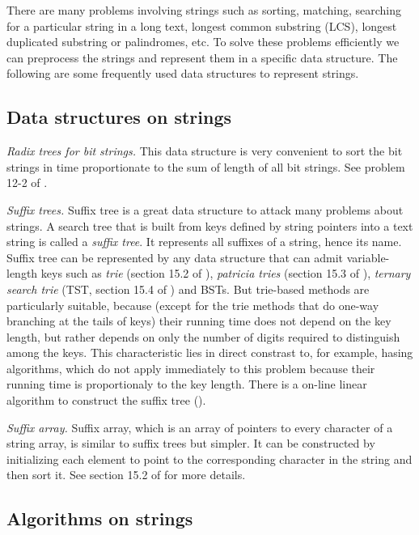 \documentclass[12pt]{article}
\begin{document}
There are many problems involving strings such as sorting, matching, searching for a
particular string in a long text, longest common substring (LCS), longest
duplicated substring or palindromes, etc.  To solve these problems
efficiently we can preprocess the strings and represent them in a
specific data structure.  The following are some frequently used data
structures to represent strings.

\subsection{Data structures on strings}

\emph{Radix trees for bit strings.}
    This data structure is very convenient to sort the bit strings in
    time proportionate to the sum of length of all bit strings.  See
    problem 12-2 of \cite{clrs2}.

\emph{Suffix trees.}
    Suffix tree is a great data structure to attack many problems about
    strings.  A search tree that is built from keys defined by string
    pointers into a text string is called a {\em suffix tree}.  It
    represents all suffixes of a string, hence its name.  Suffix
    tree can be represented by any data structure that can admit
    variable-length keys such as {\em trie} (section 15.2 of
    \cite{Sedgewick98}), {\em patricia tries} (section 15.3 of
    \cite{Sedgewick98}), {\em ternary search trie} (TST, section 15.4 of
    \cite{Sedgewick98}) and BSTs.  But trie-based methods are
    particularly suitable, because (except for the trie methods that do
    one-way branching at the tails of keys) their running time does not
    depend on the key length, but rather depends on only the number of
    digits required to distinguish among the keys. This characteristic
    lies in direct constrast to, for example, hasing algorithms, which
    do not apply immediately to this problem because their running time
    is proportionaly to the key length.  There is a on-line linear
    algorithm to construct the suffix tree (\cite{ukkonen}).

\emph{Suffix array.}
    Suffix array, which is an array of pointers to every character of
    a string array, is similar to suffix trees but simpler.  It can be
    constructed by initializing each element to point to the
    corresponding character in the string and then sort it.  See
    section 15.2 of \cite{bently00} for more details.

\subsection{Algorithms on strings}
\end{document}
